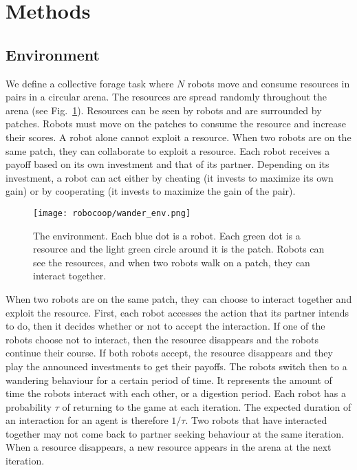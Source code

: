 \section{Methods}

\subsection{Environment}

We define a collective forage task where $N$ robots move and consume resources in pairs in a circular arena. The resources are spread randomly throughout the arena (see Fig.~\ref{fig:env}). Resources can be seen by robots and are surrounded by patches. Robots must move on the patches to consume the resource and increase their scores. A robot alone cannot exploit a resource. When two robots are on the same patch, they can collaborate to exploit a resource. Each robot receives a payoff based on its own investment and that of its partner. Depending on its investment, a robot can act either by cheating (it invests to maximize its own gain) or by cooperating (it invests to maximize the gain of the pair). 

\begin{figure}
    \begin{center}
        \texttt{[image: robocoop/wander\_env.png]}
        \vskip 0.25cm
        \caption{The environment. Each blue dot is a robot. Each green dot is a resource and the light green circle around it is the patch. Robots can see the resources, and when two robots walk on a patch, they can interact together.
        }
    \label{fig:env}
    \end{center}
\end{figure}

When two robots are on the same patch, they can choose to interact together and exploit the resource. First, each robot accesses the action that its partner intends to do, then it decides whether or not to accept the interaction. If one of the robots choose not to interact, then the resource disappears and the robots continue their course. If both robots accept, the resource disappears and they play the announced investments to get their payoffs. The robots switch then to a wandering behaviour for a certain period of time. It represents the amount of time the robots interact with each other, or a digestion period. Each robot has a probability $\tau$ of returning to the game at each iteration. The expected duration of an interaction for an agent is therefore $1/\tau$. Two robots that have interacted together may not come back to partner seeking behaviour at the same iteration. When a resource disappears, a new resource appears in the arena at the next iteration.

